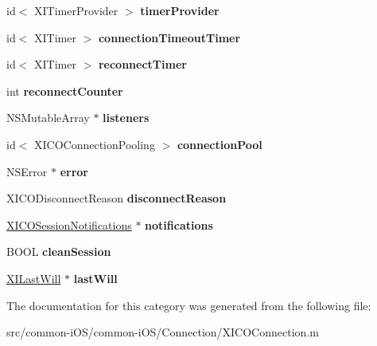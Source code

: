 \begin{DoxyCompactItemize}
id$<$ X\+I\+Timer\+Provider $>$ {\bfseries timer\+Provider}
\item 
\hypertarget{category_x_i_c_o_connection_07_08_abe31e1bbd6d76ac2a29427db7d2e486c}{}\label{category_x_i_c_o_connection_07_08_abe31e1bbd6d76ac2a29427db7d2e486c} 
id$<$ X\+I\+Timer $>$ {\bfseries connection\+Timeout\+Timer}
\item 
\hypertarget{category_x_i_c_o_connection_07_08_a51a3f755f4ea8126a9dee9820914e1e3}{}\label{category_x_i_c_o_connection_07_08_a51a3f755f4ea8126a9dee9820914e1e3} 
id$<$ X\+I\+Timer $>$ {\bfseries reconnect\+Timer}
\item 
\hypertarget{category_x_i_c_o_connection_07_08_ab11a2eec33921ee4bc1e5b82a1336324}{}\label{category_x_i_c_o_connection_07_08_ab11a2eec33921ee4bc1e5b82a1336324} 
int {\bfseries reconnect\+Counter}
\item 
\hypertarget{category_x_i_c_o_connection_07_08_a68c3ded01e4870e196442ca891ce6b5d}{}\label{category_x_i_c_o_connection_07_08_a68c3ded01e4870e196442ca891ce6b5d} 
N\+S\+Mutable\+Array $\ast$ {\bfseries listeners}
\item 
\hypertarget{category_x_i_c_o_connection_07_08_a31587af185236f17d37be57c699d20b7}{}\label{category_x_i_c_o_connection_07_08_a31587af185236f17d37be57c699d20b7} 
id$<$ X\+I\+C\+O\+Connection\+Pooling $>$ {\bfseries connection\+Pool}
\item 
\hypertarget{category_x_i_c_o_connection_07_08_a276b51402a352dda9be65d28379d6094}{}\label{category_x_i_c_o_connection_07_08_a276b51402a352dda9be65d28379d6094} 
N\+S\+Error $\ast$ {\bfseries error}
\item 
\hypertarget{category_x_i_c_o_connection_07_08_ac90b8024f48294a48abfd5958fddb4b3}{}\label{category_x_i_c_o_connection_07_08_ac90b8024f48294a48abfd5958fddb4b3} 
X\+I\+C\+O\+Disconnect\+Reason {\bfseries disconnect\+Reason}
\item 
\hypertarget{category_x_i_c_o_connection_07_08_af465ac41d36a52bec8e43720f2c1f3c1}{}\label{category_x_i_c_o_connection_07_08_af465ac41d36a52bec8e43720f2c1f3c1} 
\hyperlink{interface_x_i_c_o_session_notifications}{X\+I\+C\+O\+Session\+Notifications} $\ast$ {\bfseries notifications}
\item 
\hypertarget{category_x_i_c_o_connection_07_08_a2b506e56409ab14fc528dadccc944355}{}\label{category_x_i_c_o_connection_07_08_a2b506e56409ab14fc528dadccc944355} 
B\+O\+OL {\bfseries clean\+Session}
\item 
\hypertarget{category_x_i_c_o_connection_07_08_a6719a97d3250b9a51744e7e0ed6b9491}{}\label{category_x_i_c_o_connection_07_08_a6719a97d3250b9a51744e7e0ed6b9491} 
\hyperlink{class_x_i_last_will}{X\+I\+Last\+Will} $\ast$ {\bfseries last\+Will}
\end{DoxyCompactItemize}


The documentation for this category was generated from the following file\+:\begin{DoxyCompactItemize}
\item 
src/common-\/i\+O\+S/common-\/i\+O\+S/\+Connection/X\+I\+C\+O\+Connection.\+m\end{DoxyCompactItemize}
